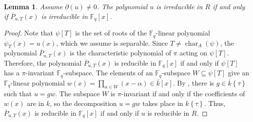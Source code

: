 \documentclass[12pt]{amsart}
\newtheorem{lem}[thm]{Lemma}
\theoremstyle{definition}
\theoremstyle{remark}
\numberwithin{equation}{section}
\numberwithin{thm}{section}
\DeclareMathOperator{\End}{End}
\DeclareMathOperator{\chr}{char}
\newcommand{\fp}{\mathfrak{p}}
\newcommand{\F}{\mathbb{F}}
\newcommand{\twist}[1]{#1\!\left\{\tau\right\}}
\begin{document}

\begin{lem}\label{prop1.8} Assume $\partial(u)\neq 0$. 
	The polynomial $u$ is irreducible in $R$ if and only if $\overline{P}_{u, T}(x)$ is irreducible in $\F_q[x]$. 
\end{lem}
\begin{proof}
	Note that $\psi[T]$ is the set of roots of the $\F_q$-linear polynomial $\psi_T(x)=u(x)$, which we assume is 
	separable.  Since $T\neq \chr_A(\psi)$, the polynomial $\overline{P}_{u, T}(x)$ is the characteristic polynomial of $\pi$ acting on $\psi[T]$. 
	Therefore, the polynomial $\overline{P}_{u, T}(x)$ is reducible in $\F_q[x]$ if and only if $\psi[T]$ has a $\pi$-invariant $\F_q$-subspace. The 
	elements of an $\F_q$-subspace  $W\subseteq \psi[T]$ give an $\F_q$-linear polynomial $w(x)=\prod_{\alpha\in W}(x-\alpha)\in \overline{k}[x]$. 
By \cite[Lem. 3.1.16]{PapikianGTM}, there is $g\in \twist{\overline{k}}$ such that $u=g w$. 
The subspace $W$ is $\pi$-invariant if and only if the coefficients of $w(x)$ are in $k$, 
so the decomposition $u=gw$ takes place in $\twist{k}$. Thus, $\overline{P}_{u, T}(x)$ is reducible in $\F_q[x]$ if and only if $u$ is reducible in $R$. 
\end{proof}
\end{document}
